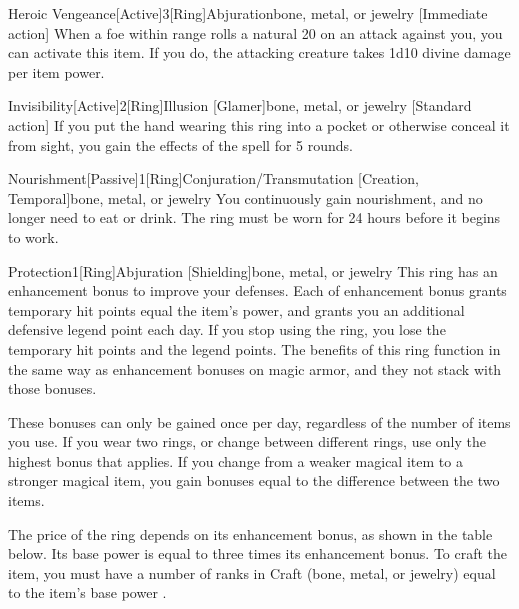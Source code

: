         \begin{magicitemdef}{Heroic Vengeance}[Active]{3}[Ring]{Abjuration}{bone, metal, or jewelry}
            [Immediate action] When a foe within \rngmed range rolls a natural 20 on an attack against you, you can activate this item.
            If you do, the attacking creature takes 1d10 divine damage per item power.
        \end{magicitemdef}

        \begin{magicitemdef}{Invisibility}[Active]{2}[Ring]{Illusion [Glamer]}{bone, metal, or jewelry}
            [Standard action] If you put the hand wearing this ring into a pocket or otherwise conceal it from sight, you gain the effects of the  spell for 5 rounds.
        \end{magicitemdef}

        \begin{magicitemdef}{Nourishment}[Passive]{1}[Ring]{Conjuration/Transmutation [Creation, Temporal]}{bone, metal, or jewelry}
             You continuously gain nourishment, and no longer need to eat or drink.
            The ring must be worn for 24 hours before it begins to work.
        \end{magicitemdef}

        \begin{magicitemdef}{Protection}{1}[Ring]{Abjuration [Shielding]}{bone, metal, or jewelry}
             This ring has an enhancement bonus to improve your defenses.
            Each  of enhancement bonus grants temporary hit points equal the item's power, and grants you an additional defensive legend point each day.
            If you stop using the ring, you lose the temporary hit points and the legend points.
            The benefits of this ring function in the same way as enhancement bonuses on magic armor, and they not stack with those bonuses.

            These bonuses can only be gained once per day, regardless of the number of items you use.
            If you wear two rings, or change between different rings, use only the highest bonus that applies.
            If you change from a weaker magical item to a stronger magical item, you gain bonuses equal to the difference between the two items.

            \spellspecial The price of the ring depends on its enhancement bonus, as shown in the table below.
            Its base power is equal to three times its enhancement bonus.
            To craft the item, you must have a number of ranks in Craft (bone, metal, or jewelry) equal to the item's base power .
        \end{magicitemdef}

